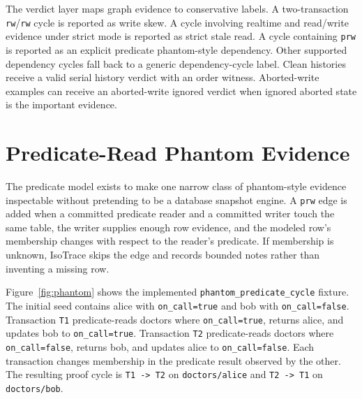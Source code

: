 \documentclass[10pt]{article}
\newcommand{\code}[1]{\texttt{#1}}
\begin{document}
The verdict layer maps graph evidence to conservative labels. A two-transaction \code{rw}/\code{rw} cycle is reported as write skew. A cycle involving realtime and read/write evidence under strict mode is reported as strict stale read. A cycle containing \code{prw} is reported as an explicit predicate phantom-style dependency. Other supported dependency cycles fall back to a generic dependency-cycle label. Clean histories receive a valid serial history verdict with an order witness. Aborted-write examples can receive an aborted-write ignored verdict when ignored aborted state is the important evidence.

\section{Predicate-Read Phantom Evidence}

The predicate model exists to make one narrow class of phantom-style evidence inspectable without pretending to be a database snapshot engine. A \code{prw} edge is added when a committed predicate reader and a committed writer touch the same table, the writer supplies enough row evidence, and the modeled row's membership changes with respect to the reader's predicate. If membership is unknown, IsoTrace skips the edge and records bounded notes rather than inventing a missing row.

Figure~\ref{fig:phantom} shows the implemented \code{phantom\_predicate\_cycle} fixture. The initial seed contains alice with \code{on\_call=true} and bob with \code{on\_call=false}. Transaction \code{T1} predicate-reads doctors where \code{on\_call=true}, returns alice, and updates bob to \code{on\_call=true}. Transaction \code{T2} predicate-reads doctors where \code{on\_call=false}, returns bob, and updates alice to \code{on\_call=false}. Each transaction changes membership in the predicate result observed by the other. The resulting proof cycle is \code{T1 -> T2} on \code{doctors/alice} and \code{T2 -> T1} on \code{doctors/bob}.
\end{document}
